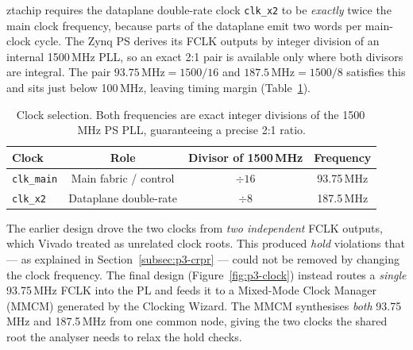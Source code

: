 ztachip requires the dataplane double-rate clock \texttt{clk\_x2} to be \emph{exactly} twice the
main clock frequency, because parts of the dataplane emit two words per main-clock cycle. The Zynq
PS derives its FCLK outputs by integer division of an internal 1500\,MHz PLL, so an exact 2:1 pair
is available only where both divisors are integral. The pair
$93.75\,\text{MHz} = 1500/16$ and $187.5\,\text{MHz} = 1500/8$ satisfies this and sits just below
100\,MHz, leaving timing margin (Table~\ref{tab:p3-clocks}).

\begin{table}[H]
\centering
\caption{Clock selection. Both frequencies are exact integer divisions of the 1500\,MHz PS PLL,
guaranteeing a precise 2:1 ratio.}
\label{tab:p3-clocks}
\renewcommand{\arraystretch}{1.2}
\begin{tabular}{@{}lccc@{}}
\toprule
\textbf{Clock} & \textbf{Role} & \textbf{Divisor of 1500\,MHz} & \textbf{Frequency} \\
\midrule
\texttt{clk\_main} & Main fabric / control & $\div 16$ & 93.75\,MHz \\
\texttt{clk\_x2}   & Dataplane double-rate & $\div 8$  & 187.5\,MHz \\
\bottomrule
\end{tabular}
\end{table}

The earlier design drove the two clocks from \emph{two independent} FCLK outputs, which Vivado
treated as unrelated clock roots. This produced \emph{hold} violations that --- as explained in
Section~\ref{subsec:p3-crpr} --- could not be removed by changing the clock frequency. The final
design (Figure~\ref{fig:p3-clock}) instead routes a \emph{single} 93.75\,MHz FCLK into the PL and
feeds it to a Mixed-Mode Clock Manager (MMCM) generated by the Clocking Wizard. The MMCM synthesises
\emph{both} 93.75\,MHz and 187.5\,MHz from one common node, giving the two clocks the shared root the
analyser needs to relax the hold checks.


